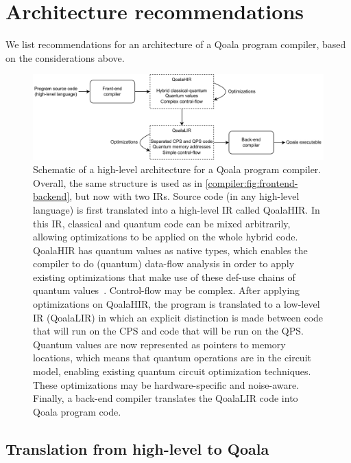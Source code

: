 \section{Architecture recommendations}
We list recommendations for an architecture of a Qoala program compiler, based on the considerations above.

\begin{figure}[t]
    \centering
    \includegraphics[width=\columnwidth]{figures/compiler/overall-design.pdf}
    \caption{Schematic of a high-level architecture for a Qoala program compiler.
    Overall, the same structure is used as in \cref{compiler:fig:frontend-backend}, but now with two \ac{IR}s.
    Source code (in any high-level language) is first translated into a high-level \ac{IR} called QoalaHIR. In this \ac{IR}, classical and quantum code can be mixed arbitrarily, allowing optimizations to be applied on the whole hybrid code.
    QoalaHIR has quantum values as native types, which enables the compiler to do (quantum) data-flow analysis in order to apply existing optimizations that make use of these def-use chains of quantum values~\cite{peduri_qssa_2022}. Control-flow may be complex.
    After applying optimizations on QoalaHIR, the program is translated to a low-level \ac{IR} (QoalaLIR) in which an explicit distinction is made between code that will run on the CPS and code that will be run on the QPS.
    Quantum values are now represented as pointers to memory locations, which means that quantum operations are in the circuit model, enabling existing quantum circuit optimization techniques.
    These optimizations may be hardware-specific and noise-aware.
    Finally, a back-end compiler translates the QoalaLIR code into Qoala program code.
    }
    \label{compiler:fig:overall-design}
\end{figure}

\subsection{Translation from high-level to Qoala}
\label{compiler:sec:translation}

